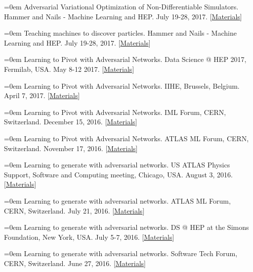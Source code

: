\documentclass{scrartcl}
\newcommand{\MarginText}[1]{\marginpar{\raggedleft\itshape\small#1}}
\newcommand{\NewPublication}[4]{\noindent\hangindent=0em\hangafter=0 \MarginText{\color{black} #1}{\footnotesize [{\color{Maroon}#2}]} #3 {\footnotesize\color{gray}#4}\vspace{0.5em}}
\begin{document}
\begin{cv}{}
\vspace{1em}

\NewPublication{talks}{31}{Adversarial Variational Optimization of Non-Differentiable Simulators.}{%
Hammer and Nails - Machine Learning and HEP.
July 19-28, 2017.
[\href{https://www.weizmann.ac.il/conferences/SRitp/Summer2017/program}{Materials}]}

\NewPublication{}{30}{Teaching machines to discover particles.}{%
Hammer and Nails - Machine Learning and HEP.
July 19-28, 2017.
[\href{https://www.weizmann.ac.il/conferences/SRitp/Summer2017/program}{Materials}]}

\NewPublication{}{29}{Learning to Pivot with Adversarial Networks.}{%
Data Science @ HEP 2017, Fermilab, USA.
May 8-12 2017.
[\href{https://github.com/glouppe/talk-learning-to-pivot}{Materials}]}

\NewPublication{}{28}{Learning to Pivot with Adversarial Networks.}{%
IIHE, Brussels, Belgium.
April 7, 2017.
[\href{https://github.com/glouppe/talk-learning-to-pivot}{Materials}]}

\NewPublication{}{27}{Learning to Pivot with Adversarial Networks.}{%
IML Forum, CERN, Switzerland.
December 15, 2016.
[\href{https://github.com/glouppe/talk-learning-to-pivot}{Materials}]}

\NewPublication{}{26}{Learning to Pivot with Adversarial Networks.}{%
ATLAS ML Forum, CERN, Switzerland.
November 17, 2016.
[\href{https://github.com/glouppe/talk-learning-to-pivot}{Materials}]}

\NewPublication{}{25}{Learning to generate with adversarial networks.}{%
US ATLAS Physics Support, Software and Computing meeting, Chicago, USA.
August 3, 2016.
[\href{https://indico.cern.ch/event/526308/}{Materials}]}

\NewPublication{}{24}{Learning to generate with adversarial networks.}{%
ATLAS ML Forum, CERN, Switzerland.
July 21, 2016.
[\href{https://indico.cern.ch/event/556591/}{Materials}]}

\NewPublication{}{23}{Learning to generate with adversarial networks.}{%
DS @ HEP at the Simons Foundation, New York, USA.
July 5-7, 2016.
[\href{https://indico.hep.caltech.edu/indico/conferenceTimeTable.py?confId=102}{Materials}]}

\NewPublication{}{22}{Learning to generate with adversarial networks.}{%
Software Tech Forum, CERN, Switzerland.
June 27, 2016.
[\href{https://indico.cern.ch/event/544644/contributions/2210328/attachments/1299201/1938586/slides.pdf}{Materials}]}


\end{cv}
\end{document}
